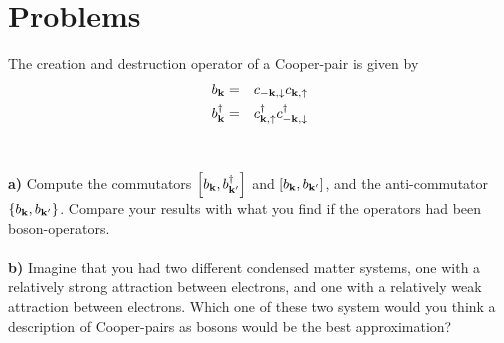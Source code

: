 
\section*{Problems}

\begin{problem}
	
The creation and destruction operator of a Cooper-pair is given by 
\begin{eqnarray}
	b_{\bf k} & =  & c_{-{\bf k}, \downarrow} c_{{\bf k}, \uparrow} \nonumber \\  
	b^{\dagger}_{\bf k} & =  & c^{\dagger}_{{\bf k}, \uparrow} c^{\dagger}_{-{\bf k}, \downarrow} \nonumber  
\end{eqnarray}
\ \\
\ \\
{\bf a) } Compute the commutators $\left[ b_{\bf k}, b^{\dagger}_{{\bf k}^{\prime}} \right]$  and 
$\left[ b_{\bf k}, b_{{\bf k}^{\prime}} \right]$, and the anti-commutator  $\left\{ b_{\bf k}, b_{{\bf k}^{\prime}} \right\}$. 
Compare your results with what you find if the operators had been boson-operators. 
\ \\
\ \\
{\bf b)} Imagine that you had two different condensed matter systems, one with a relatively strong attraction between electrons, and one with a relatively weak attraction between electrons.  Which one of these two system would you think a description of Cooper-pairs as bosons would be the best approximation?  
\end{problem}
